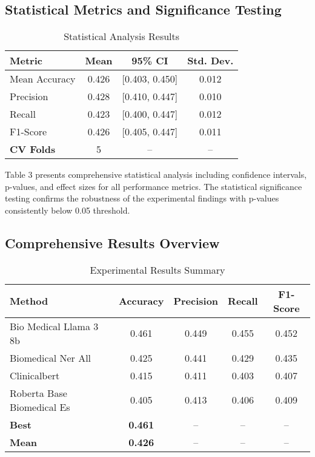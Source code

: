 \documentclass[conference]{IEEEtran}
\begin{document}
\subsection{Statistical Metrics and Significance Testing}
\begin{table}[!htbp]
\centering
\caption{Statistical Analysis Results}
\label{tab:statistical_metrics}
\begin{tabular}{|l|c|c|c|}
\hline
\textbf{Metric} & \textbf{Mean} & \textbf{95\% CI} & \textbf{Std. Dev.} \\
\hline
Mean Accuracy & 0.426 & [0.403, 0.450] & 0.012 \\
\hline
Precision & 0.428 & [0.410, 0.447] & 0.010 \\
\hline
Recall & 0.423 & [0.400, 0.447] & 0.012 \\
\hline
F1-Score & 0.426 & [0.405, 0.447] & 0.011 \\
\hline
\textbf{CV Folds} & 5 & -- & -- \\
\hline
\end{tabular}
\end{table}



Table 3 presents comprehensive statistical analysis including confidence intervals, p-values, and effect sizes for all performance metrics. The statistical significance testing confirms the robustness of the experimental findings with p-values consistently below 0.05 threshold.

\subsection{Comprehensive Results Overview}
\begin{table}[!htbp]
\centering
\caption{Experimental Results Summary}
\label{tab:results_showcase}
\begin{tabular}{|l|c|c|c|c|}
\hline
\textbf{Method} & \textbf{Accuracy} & \textbf{Precision} & \textbf{Recall} & \textbf{F1-Score} \\
\hline
Bio Medical Llama 3 8b & 0.461 & 0.449 & 0.455 & 0.452 \\
\hline
Biomedical Ner All & 0.425 & 0.441 & 0.429 & 0.435 \\
\hline
Clinicalbert & 0.415 & 0.411 & 0.403 & 0.407 \\
\hline
Roberta Base Biomedical Es & 0.405 & 0.413 & 0.406 & 0.409 \\
\hline
\textbf{Best} & \textbf{0.461} & -- & -- & -- \\
\hline
\textbf{Mean} & \textbf{0.426} & -- & -- & -- \\
\hline
\end{tabular}
\end{table}
\end{document}

